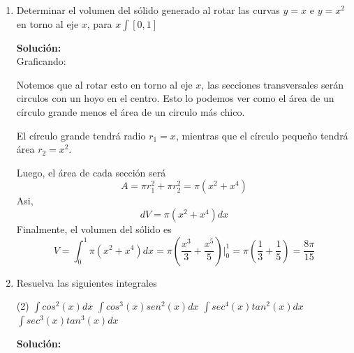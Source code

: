 \documentclass[12pt]{article}
\newenvironment{solucion}
{\begin{mdframed}[backgroundcolor=black!10]
		{\bf Solución:}\\
	}
	{
	\end{mdframed}
}
\newenvironment{preguntas}
{\begin{enumerate}\itemsep12pt
	}
	{
	\end{enumerate}
}
\newcommand{\ev}{\Big|}
\begin{document}
\begin{preguntas}
\begin{solucion}
		Como integraremos en el eje $x$, necesitamos el cateto del triángulo en función de $y$. Es decir, despejando en la ecuación del círculo,
		$$y = \sqrt[]{a^2-x^2}$$
		Como este es el catéto y nuestro triángulo es rectángulo isóceles, sabemos que su área será
		$$A =  \dfrac{(\sqrt[]{a^2-x^2})^2}{2} = \dfrac{a^2-x^2}{2}$$
		Luego,
		$$dV = \dfrac{a^2-x^2}{2} dx$$
		Finalmente, el volumen es
		$$V = 4 \displaystyle \int_0^a \dfrac{a^2-x^2}{2} dx = 4\left(\dfrac{a^2x}{2} - \dfrac{x^3}{6}\right) \ev_0^a = 4\left(\dfrac{a^3}{2} - \dfrac{a^3}{6}\right) = 4\left(\dfrac{2a^3}{6}\right) = \dfrac{4}{3}a^3$$
\end{solucion}
\item Determinar el volumen del sólido generado al rotar las curvas $y=x$ e $y= x^2$ en torno al eje $x$, para $x \int [0,1]$
\begin{solucion}
Graficando:
		\begin{center}
		\end{center}
		
		Notemos que al rotar esto en torno al eje $x$, las secciones transversales serán circulos con un hoyo en el centro. Esto lo podemos ver como el área de un círculo grande menos el área de un circulo más chico.
		
		El círculo grande tendrá radio $r_1 = x$, mientras que el círculo pequeño tendrá área $r_2 = x^2$. 
		
		Luego, el área de cada sección será
		$$A = \pi r_1^2 + \pi r_2^2 = \pi(x^2+x^4) $$
		Asi,
		$$dV = \pi(x^2+x^4)dx$$
		Finalmente, el volumen del sólido es
		$$V = \int_0^1 \pi(x^2+x^4)dx = \pi\left(\dfrac{x^3}{3} + \dfrac{x^5}{5}\right)\ev_0^1 = \pi \left(\dfrac{1}{3}+\dfrac{1}{5}\right) = \dfrac{8\pi}{15}$$
\end{solucion}
\item Resuelva las siguientes integrales
\begin{tasks}(2)
\task $\displaystyle\int cos^2(x)dx$
\task $\displaystyle\int cos^3(x)sen^2(x)dx$
\task $\displaystyle\int sec^4(x)tan^2(x)dx$
\task $\displaystyle\int sec^3(x)tan^3(x)dx$
\end{tasks}
\begin{solucion}


\end{solucion}
\end{preguntas}
\end{document}
